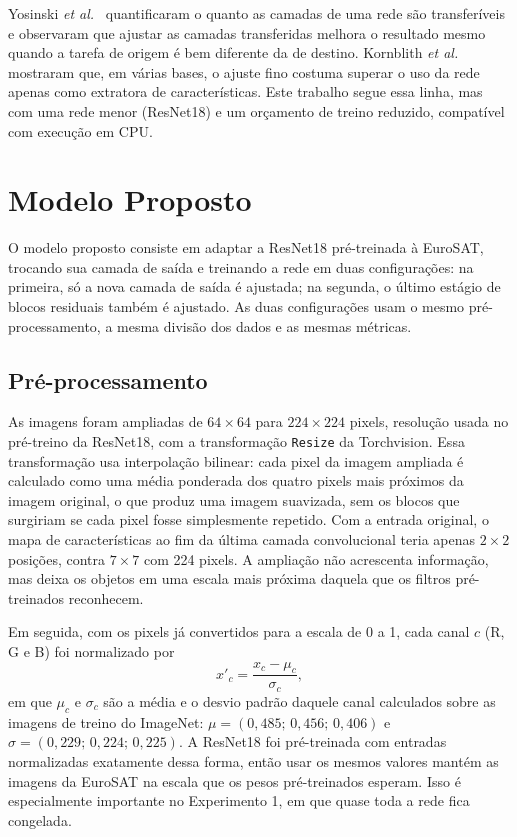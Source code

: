 \documentclass[conference,a4paper]{IEEEtran}
\begin{document}
Yosinski \textit{et al.}~\cite{yosinski2014transferable} quantificaram o quanto as camadas de uma rede são transferíveis e observaram que ajustar as camadas transferidas melhora o resultado mesmo quando a tarefa de origem é bem diferente da de destino. Kornblith \textit{et al.}~\cite{kornblith2019better} mostraram que, em várias bases, o ajuste fino costuma superar o uso da rede apenas como extratora de características. Este trabalho segue essa linha, mas com uma rede menor (ResNet18) e um orçamento de treino reduzido, compatível com execução em CPU.

\section{Modelo Proposto}
\label{sec:metodo}

O modelo proposto consiste em adaptar a ResNet18 pré-treinada à EuroSAT, trocando sua camada de saída e treinando a rede em duas configurações: na primeira, só a nova camada de saída é ajustada; na segunda, o último estágio de blocos residuais também é ajustado. As duas configurações usam o mesmo pré-processamento, a mesma divisão dos dados e as mesmas métricas.

\subsection{Pré-processamento}

As imagens foram ampliadas de $64\times64$ para $224\times224$ pixels, resolução usada no pré-treino da ResNet18, com a transformação \texttt{Resize} da Torchvision. Essa transformação usa interpolação bilinear: cada pixel da imagem ampliada é calculado como uma média ponderada dos quatro pixels mais próximos da imagem original, o que produz uma imagem suavizada, sem os blocos que surgiriam se cada pixel fosse simplesmente repetido. Com a entrada original, o mapa de características ao fim da última camada convolucional teria apenas $2\times2$ posições, contra $7\times7$ com 224 pixels. A ampliação não acrescenta informação, mas deixa os objetos em uma escala mais próxima daquela que os filtros pré-treinados reconhecem.

Em seguida, com os pixels já convertidos para a escala de 0 a 1, cada canal $c$ (R, G e B) foi normalizado por
\begin{equation}
x'_c = \frac{x_c - \mu_c}{\sigma_c},
\end{equation}
em que $\mu_c$ e $\sigma_c$ são a média e o desvio padrão daquele canal calculados sobre as imagens de treino do ImageNet: $\mu = (0{,}485;\, 0{,}456;\, 0{,}406)$ e $\sigma = (0{,}229;\, 0{,}224;\, 0{,}225)$. A ResNet18 foi pré-treinada com entradas normalizadas exatamente dessa forma, então usar os mesmos valores mantém as imagens da EuroSAT na escala que os pesos pré-treinados esperam. Isso é especialmente importante no Experimento 1, em que quase toda a rede fica congelada.
\end{document}
